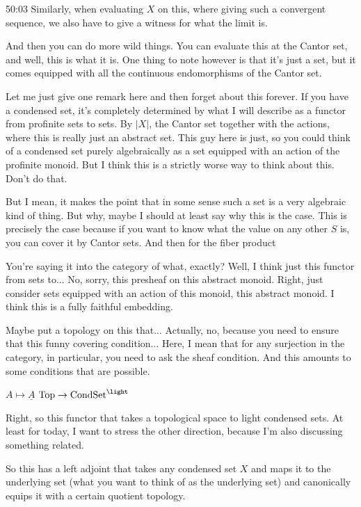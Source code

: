 \begin{example}
\begin{unfinished}{50:03}
Similarly, when evaluating $X$ on this, where giving such a convergent sequence, we also have to give a witness for what the limit is.

And then you can do more wild things. You can evaluate this at the Cantor set, and well, this is what it is. One thing to note however is that it's just a set, but it comes equipped with all the continuous endomorphisms of the Cantor set.

\begin{remark}
Let me just give one remark here and then forget about this forever. If you have a condensed set, it's completely determined by what I will describe as a functor from profinite sets to sets. By $|X|$, the Cantor set together with the actions, where this is really just an abstract set. This guy here is just, so you could think of a condensed set purely algebraically as a set equipped with an action of the profinite monoid. But I think this is a strictly worse way to think about this. Don't do that.

But I mean, it makes the point that in some sense such a set is a very algebraic kind of thing. But why, maybe I should at least say why this is the case. This is precisely the case because if you want to know what the value on any other $S$ is, you can cover it by Cantor sets. And then for the fiber product

You're saying it into the category of what, exactly? Well, I think just this functor from sets to... No, sorry, this presheaf on this abstract monoid. Right, just consider sets equipped with an action of this monoid, this abstract monoid. I think this is a fully faithful embedding.

Maybe put a topology on this that... Actually, no, because you need to ensure that this funny covering condition... Here, I mean that for any surjection in the category, in particular, you need to ask the sheaf condition. And this amounts to some conditions that are possible.

\end{remark}


\begin{proposition}
$A \mapsto \underline{A}$
$\Top \to \Cond\Set^{\light}$
\end{proposition}
Right, so this functor that takes a topological space to light condensed sets. At least for today, I want to stress the other direction, because I'm also discussing something related.

So this has a left adjoint that takes any condensed set $X$ and maps it to the underlying set (what you want to think of as the underlying set) and canonically equips it with a certain quotient topology.


\end{unfinished}
\end{example}
